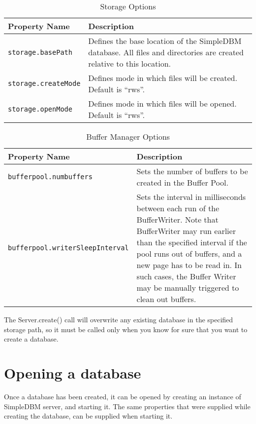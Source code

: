 \documentclass[a4paper,draft,oneside]{book}
\begin{document}
\begin{table}[tbp]
\begin{center}
\begin{tabular}{|l|p{6cm}|}
  \hline
  \textbf{Property Name}&\textbf{Description}  \\
  \hline 
  \verb|storage.basePath|&Defines the base location of the
  SimpleDBM database. All files and directories are created relative to this
  location.  \\
  \hline 
  \verb|storage.createMode|&Defines mode in which files will be
  created. Default is ``rws''.  \\
  \hline 
  \verb|storage.openMode|&Defines mode in which files will be
  opened. Default is ``rws''.  \\
  \hline 
\end{tabular}
\end{center}
\caption{Storage Options}
\label{tbstorageoptions}
\end{table}

\begin{table}[tbp]
\begin{center}
\begin{tabular}{|l|p{5cm}|}
  \hline
  \textbf{Property Name}&\textbf{Description}  \\
  \hline 
  \verb|bufferpool.numbuffers|&Sets the number of buffers to be created in 
  the Buffer Pool.  \\
  \hline 
  \verb|bufferpool.writerSleepInterval|&Sets the interval in 
  milliseconds between each run of the BufferWriter. Note that BufferWriter 
  may run earlier than the specified interval if the pool runs out of 
  buffers, and a new page has to be read in. In such cases, the Buffer Writer
  may be manually triggered to clean out buffers.  \\
  \hline
\end{tabular}
\end{center}
\caption{Buffer Manager Options}
\label{tbbufferoptions}
\end{table}

The Server.create() call will overwrite any existing database
in the specified storage path, so it must be called only when you know
for sure that you want to create a database.

\section{Opening a database}

Once a database has been created, it can be opened by creating an
instance of SimpleDBM server, and starting it. The same properties that were
supplied while creating the database, can be supplied when starting it.
\end{document}
